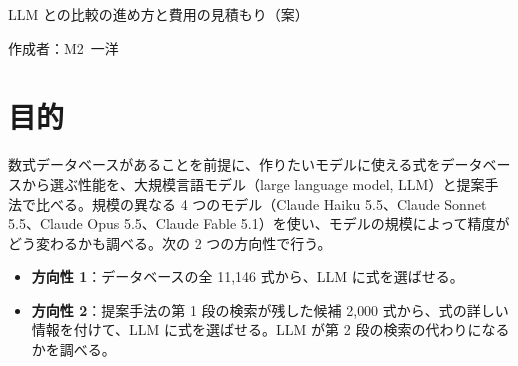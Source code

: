 \documentclass[11pt,a4paper]{ltjsarticle}
\begin{document}
\begin{center}
{\sffamily\large LLM との比較の進め方と費用の見積もり（案）}
\end{center}
\vspace{0.3em}
\hfill 作成者：M2\ 一洋
\vspace{0.8em}

\section{目的}
数式データベースがあることを前提に、作りたいモデルに使える式をデータベースから選ぶ性能を、大規模言語モデル（large language model, LLM）と提案手法で比べる。規模の異なる 4 つのモデル（Claude Haiku 5.5、Claude Sonnet 5.5、Claude Opus 5.5、Claude Fable 5.1）を使い、モデルの規模によって精度がどう変わるかも調べる。次の 2 つの方向性で行う。
\begin{itemize}[leftmargin=1.5em]
  \item \textbf{方向性 1}：データベースの全 11{,}146 式から、LLM に式を選ばせる。
  \item \textbf{方向性 2}：提案手法の第 1 段の検索が残した候補 2{,}000 式から、式の詳しい情報を付けて、LLM に式を選ばせる。LLM が第 2 段の検索の代わりになるかを調べる。
\end{itemize}

\end{document}
